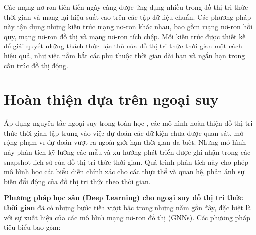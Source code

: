 Các mạng nơ-ron tiên tiến ngày càng được ứng dụng nhiều trong đồ thị tri thức thời gian và mang lại hiệu suất cao trên các tập dữ liệu chuẩn. Các phương pháp này tận dụng những kiến trúc mạng nơ-ron khác nhau, bao gồm mạng nơ-ron hồi quy, mạng nơ-ron đồ thị và mạng nơ-ron tích chập. Mỗi kiến trúc được thiết kế để giải quyết những thách thức đặc thù của đồ thị tri thức thời gian một cách hiệu quả, như việc nắm bắt các phụ thuộc thời gian dài hạn và ngắn hạn trong cấu trúc đồ thị động.

\section{Hoàn thiện dựa trên ngoại suy}

Áp dụng nguyên tắc ngoại suy trong toán học \cite{ref_article30}, các mô hình hoàn thiện đồ thị tri thức thời gian tập trung vào việc dự đoán các dữ kiện chưa được quan sát, mở rộng phạm vi dự đoán vượt ra ngoài giới hạn thời gian đã biết. Những mô hình này phân tích kỹ lưỡng các mẫu và xu hướng phát triển được ghi nhận trong các snapshot lịch sử của đồ thị tri thức thời gian. Quá trình phân tích này cho phép mô hình học các biểu diễn chính xác cho các thực thể và quan hệ, phản ánh sự biến đổi động của đồ thị tri thức theo thời gian.

\textbf{Phương pháp học sâu (Deep Learning) cho ngoại suy đồ thị tri thức thời gian} đã có những bước tiến vượt bậc trong những năm gần đây, đặc biệt là với sự xuất hiện của các mô hình mạng nơ-ron đồ thị (GNNs). Các phương pháp tiêu biểu bao gồm:


